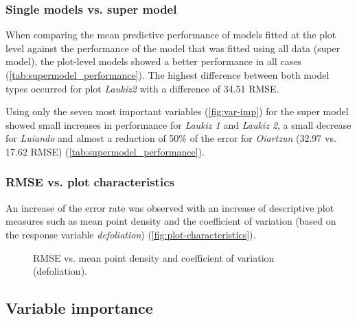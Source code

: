 \documentclass[review]{elsarticle}
\begin{document}
\subsubsection{Single models vs. super model}

\noindent When comparing the mean predictive performance of models fitted at the plot level against the performance of the model that was fitted using all data (super model), the plot-level models showed a better performance in all cases (\autoref{tab:supermodel_performance}).
The highest difference between both model types occurred for plot \textit{Laukiz2} with a difference of 34.51 RMSE.

Using only the seven most important variables (\autoref{fig:var-imp}) for the super model showed small increases in performance for \textit{Laukiz 1} and \textit{Laukiz 2}, a small decrease for \textit{Luiando} and almost a reduction of 50\% of the error for \textit{Oiartzun} (32.97 vs. 17.62 RMSE) (\autoref{tab:supermodel_performance}).

\subsubsection{RMSE vs. plot characteristics}

\noindent An increase of the error rate was observed with an increase of descriptive plot measures such as mean point density and the coefficient of variation (based on the response variable \textit{defoliation}) (\autoref{fig:plot-characteristics}).

\begin{figure} [t!]
	\begin{center}
		\caption{RMSE vs. mean point density and coefficient of variation (defoliation).}
		\label{fig:plot-characteristics}
	\end{center}
\end{figure}

\subsection{Variable importance}
\end{document}
